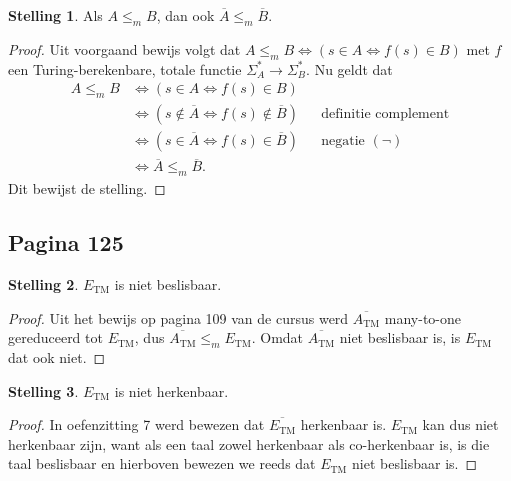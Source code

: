 \documentclass[kulak]{kulakarticle}
\theoremstyle{definition}
\newtheorem*{stelling}{Stelling}
\begin{document}
	\begin{stelling}
		Als \(A \leq_m B\), dan ook \(\overline{A} \leq_m \overline{B}\).
	\end{stelling}

	\begin{proof}
		Uit voorgaand bewijs volgt dat \(A \leq_m B \Leftrightarrow (s\in A \Leftrightarrow f(s)\in B)\) met \( f \) een Turing-berekenbare, totale functie \(\Sigma_A^*\to\Sigma_B^*\). Nu geldt dat \begin{align*}
			A \leq_m B & \Leftrightarrow (s\in A \Leftrightarrow f(s)\in B) \\
			& \Leftrightarrow (s\notin \overline{A} \Leftrightarrow f(s)\notin \overline{B}) && \text{definitie complement} \\
			& \Leftrightarrow (s\in \overline{A} \Leftrightarrow f(s)\in \overline{B}) && \text{negatie } (\neg) \\
			& \Leftrightarrow \overline{A} \leq_m \overline{B}.
		\end{align*}
		Dit bewijst de stelling.
	\end{proof}

	\subsection*{Pagina 125}

	\begin{stelling}
		\(E_\text{TM}\) is niet beslisbaar.
	\end{stelling}

	\begin{proof}
		Uit het bewijs op pagina 109 van de cursus werd \(\overline{A_\text{TM}}\) many-to-one gereduceerd tot \(E_\text{TM}\), dus \(\overline{A_\text{TM}} \leq_m E_\text{TM}\). Omdat \(\overline{A_\text{TM}}\) niet beslisbaar is, is \(E_\text{TM}\) dat ook niet.
	\end{proof}

	\begin{stelling}
		\(E_\text{TM}\) is niet herkenbaar.
	\end{stelling}

	\begin{proof}
		In oefenzitting 7 werd bewezen dat \(\overline{E_\text{TM}}\) herkenbaar is. \(E_\text{TM}\) kan dus niet herkenbaar zijn, want als een taal zowel herkenbaar als co-herkenbaar is, is die taal beslisbaar en hierboven bewezen we reeds dat \(E_\text{TM}\) niet beslisbaar is.
	\end{proof}
\end{document}
